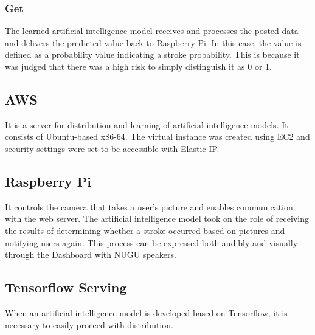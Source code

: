 \subsubsection{Get}
The learned artificial intelligence model receives and processes the posted data and delivers the predicted value back to Raspberry Pi. In this case, the value is defined as a probability value indicating a stroke probability. This is because it was judged that there was a high risk to simply distinguish it as 0 or 1.

\subsection{AWS}
It is a server for distribution and learning of artificial intelligence models. It consists of Ubuntu-based x86-64. The virtual instance was created using EC2 and security settings were set to be accessible with Elastic IP.

\subsection{Raspberry Pi}
It controls the camera that takes a user's picture and enables communication with the web server. The artificial intelligence model took on the role of receiving the results of determining whether a stroke occurred based on pictures and notifying users again. This process can be expressed both audibly and visually through the Dashboard with NUGU speakers.

\subsection{Tensorflow Serving}
When an artificial intelligence model is developed based on Tensorflow, it is necessary to easily proceed with distribution.

